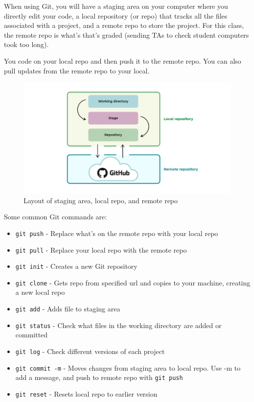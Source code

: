 \documentclass[nobib]{tufte-handout}
\begin{document}

When using Git, you will have a staging area on your computer where
you directly edit your code, a local repository (or repo)
that tracks all the files associated with a project, and a remote repo
to store the project. For this class, the remote repo is what's
that's graded (sending TAs to check student computers took too long).

You code on your local repo 
and then push it to the remote repo. You can also pull updates 
from the remote repo to your local.
\begin{figure}
   \centering
   \includegraphics{images/workingdir-stage-local-remote.png}
   \caption{Layout of staging area, local repo, and remote repo}
   \label{fig:wdstagelocalremote} 
\end{figure}

Some common Git commands are:
\begin{itemize}
   \item \texttt{git push} - Replace what's on the remote repo with your local repo
   \item \texttt{git pull} - Replace your local repo with the remote repo
   \item \texttt{git init} - Creates a new Git repository
   \item \texttt{git clone} - Gets repo from specified url and copies to your machine, creating a new local repo
   \item \texttt{git add} - Adds file to staging area
   \item \texttt{git status} - Check what files in the working directory
   are added or committed
   \item \texttt{git log} - Check different versions of each project
   \item \texttt{git commit -m} - Moves changes from staging area to local repo. Use -m to add a message, and push
   to remote repo with \texttt{git push}
   \item \texttt{git reset} - Resets local repo to earlier version
\end{itemize}
\end{document}
